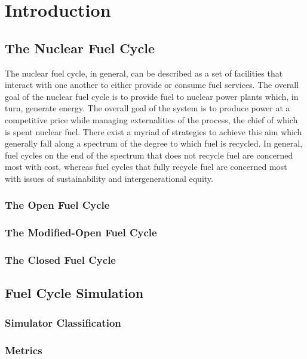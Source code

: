 \chapter{Introduction}\label{ch:intro}

\section{The Nuclear Fuel Cycle}

The nuclear fuel cycle, in general, can be described as a set of facilities that
interact with one another to either provide or consume fuel services. The
overall goal of the nuclear fuel cycle is to provide fuel to nuclear power
plants which, in turn, generate energy. The overall goal of the system is to
produce power at a competitive price while managing externalities of the
process, the chief of which is spent nuclear fuel. There exist a myriad of
strategies to achieve this aim which generally fall along a spectrum of the
degree to which fuel is recycled. In general, fuel cycles on the end of the
spectrum that does not recycle fuel are concerned most with cost, whereas fuel
cycles that fully recycle fuel are concerned most with issues of sustainability
and intergenerational equity.

\subsection{The Open Fuel Cycle}


\subsection{The Modified-Open Fuel Cycle}

\subsection{The Closed Fuel Cycle}

\section{Fuel Cycle Simulation}

\subsection{Simulator Classification}

\subsection{Metrics}

